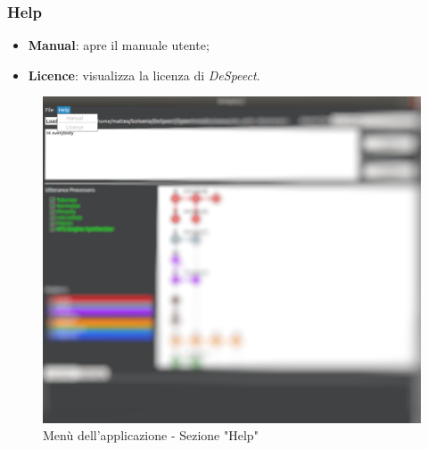 \documentclass[openany,12pt,a4paper]{report}
\begin{document}
 	\subsubsection{Help}
 		\begin{itemize}
 			\item \textbf{Manual}: apre il manuale utente;
 			\item \textbf{Licence}: visualizza la licenza di \textit{DeSpeect}.
 		\end{itemize}
 		\begin{figure}[H]
 			
 			\centering
 			
 			\includegraphics[scale=0.3]{./img/help}
 			
 			\caption{Menù dell'applicazione - Sezione "Help"}
 			
 		\end{figure}
 	
 	\newpage
 	
\end{document}

